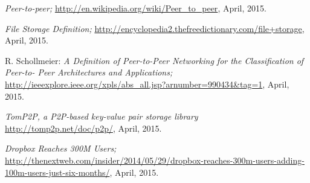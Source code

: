 \begin{thebibliography}{99}
		\emph{Peer-to-peer;}
		\url{http://en.wikipedia.org/wiki/Peer_to_peer},
		April, 2015.
		
		\emph{File Storage Definition;}
		\url{http://encyclopedia2.thefreedictionary.com/file+storage},
		April, 2015.
		
		R. Schollmeier:
		\emph{A Definition of Peer-to-Peer Networking for the Classification of Peer-to- Peer Architectures and Applications;}
		\url{http://ieeexplore.ieee.org/xpls/abs_all.jsp?arnumber=990434&tag=1},
		April, 2015.
		
		\emph{TomP2P, a P2P-based key-value pair storage library}
		\url{http://tomp2p.net/doc/p2p/},
		April, 2015.
		
		\emph{Dropbox Reaches 300M Users;}
		\url{http://thenextweb.com/insider/2014/05/29/dropbox-reaches-300m-users-adding-100m-users-just-six-months/},
		April, 2015.

\end{thebibliography}